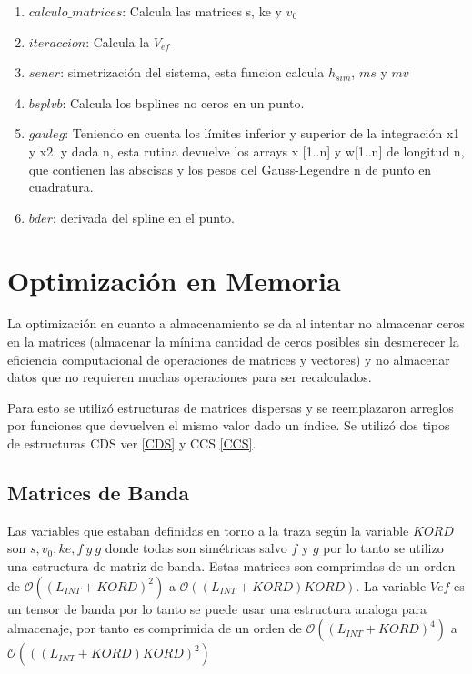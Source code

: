 \documentclass[a4paper,openright,12pt, oneside]{book}
\DeclareRobustCommand{\orderof}{\ensuremath{\mathcal{O}}}
\begin{document}
\begin{enumerate}
    \item $calculo\_matrices$: Calcula las matrices s, ke y $v_0$
    \item $iteraccion$: Calcula la $V_{ef}$
    \item $sener$: simetrizaci\'on del sistema, esta funcion calcula $h_{sim}$, $ms$ y $mv$
    \item $bsplvb$: Calcula los bsplines no ceros en un punto.
    \item $gauleg$: Teniendo en cuenta los l\'imites inferior y superior de la integraci\'on x1 y x2, y dada n, esta rutina devuelve los arrays x [1..n] y w[1..n] de longitud n, que contienen las abscisas y los pesos del Gauss-Legendre n de punto en cuadratura.
    \item $bder$: derivada del spline en el punto.
\end{enumerate}

\section{Optimizaci\'on en Memoria}

La optimizaci\'on en cuanto a almacenamiento se da al intentar no almacenar ceros en la matrices (almacenar la m\'inima cantidad de ceros posibles sin desmerecer la eficiencia computacional de 
operaciones de matrices y vectores) y no almacenar datos que no requieren muchas operaciones para ser recalculados.

Para esto se utiliz\'o estructuras de matrices dispersas y se reemplazaron arreglos por funciones que devuelven el mismo valor dado un \'indice. Se utiliz\'o dos tipos de estructuras CDS ver \ref{CDS} y CCS \ref{CCS}.

\subsection{Matrices de Banda}
Las variables que estaban definidas en torno a la traza seg\'un la variable $KORD$ son $s, v_0, ke, f\ y\ g$ 
donde todas son sim\'etricas salvo $f$ y $g$ por lo tanto se utilizo una estructura de matriz de banda. 
Estas matrices son comprimdas de un orden de $\orderof{((L_{INT} + KORD)^2)}$ a $\orderof{((L_{INT}+
  KORD) KORD)}$. La variable $Vef$ es un tensor de banda por lo tanto se puede usar una estructura 
 analoga para almacenaje, por tanto es comprimida de un orden de $\orderof{((L_{INT} + KORD)^4)}$ a $\orderof{(( (L_{INT} + KORD) KORD)^2)}$
\end{document}
